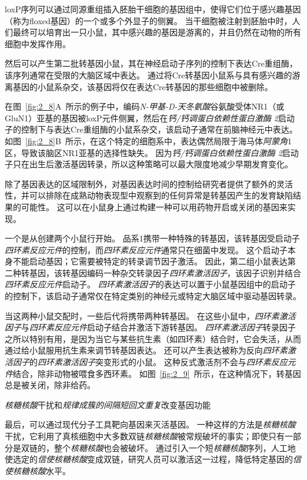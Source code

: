 \begin{proposition}[在实验动物中产生突变]
	\quad \quad loxP序列可以通过同源重组插入胚胎干细胞的基因组中，使得它们位于感兴趣基因（称为floxed基因）的一个或多个外显子的侧翼。
	当干细胞被注射到胚胎中时，人们最终可以培育出一只小鼠，其中感兴趣的基因是游离的，并且仍然在动物的所有细胞中发挥作用。
	
	\quad \quad 然后可以产生第二批转基因小鼠，其在神经启动子序列的控制下表达Cre重组酶，该序列通常在受限的大脑区域中表达。
	通过将Cre转基因小鼠系与具有感兴趣的游离基因的小鼠系杂交，该基因将仅在表达Cre转基因的那些细胞中被删除。
	
	\quad \quad 在图~\ref{fig:2_8}A~所示的例子中，编码\textit{N-甲基-D-天冬氨酸}谷氨酸受体NR1（或GluN1）亚基的基因被loxP元件侧翼，然后在\textit{钙/钙调蛋白依赖性蛋白激酶 2}启动子的控制下与表达Cre重组酶的小鼠系杂交，该启动子通常在前脑神经元中表达。
	如图~\ref{fig:2_8}B~所示，在这个特定的细胞系中，表达偶然局限于海马体\textit{阿蒙角}1区，导致该脑区NR1亚基的选择性缺失。
	因为\textit{钙/钙调蛋白依赖性蛋白激酶 2}启动子只在出生后激活基因转录，所以这种策略可以最大限度地减少早期发育变化。
	
	\quad \quad 除了基因表达的区域限制外，对基因表达时间的控制给研究者提供了额外的灵活性，并可以排除在成熟动物表现型中观察到的任何异常是转基因产生的发育缺陷结果的可能性。
	这可以在小鼠身上通过构建一种可以用药物开启或关闭的基因来实现。
	
	\quad \quad 一个是从创建两个小鼠行开始。
	品系1携带一种特殊的转基因，该转基因受启动子\textit{四环素反应元件}的控制，而\textit{四环素反应元件}通常只在细菌中发现。
	这个启动子本身不能启动基因；它需要被特定的转录调节因子激活。
	因此，第二组小鼠表达第二种转基因，该转基因编码一种杂交转录因子\textit{四环素激活因子}，该因子识别并结合\textit{四环素反应元件}启动子。
	\textit{四环素激活因子}的表达可以置于小鼠基因组中的启动子的控制下，该启动子通常仅在特定类别的神经元或特定大脑区域中驱动基因转录。
	
	\quad \quad 当这两种小鼠交配时，一些后代将携带两种转基因。
	在这些小鼠中，\textit{四环素激活因子}与\textit{四环素反应元件}启动子结合并激活下游转基因。
	\textit{四环素激活因子}转录因子之所以特别有用，是因为当它与某些抗生素（如四环素）结合时，它会失活，从而通过给小鼠服用抗生素来调节转基因表达。
	还可以产生表达被称为反向\textit{四环素激活因子}的\textit{四环素激活因子}突变形式的小鼠。
	这种反式激活剂不会与\textit{四环素反应元件}结合，除非动物被喂食多西环素。
	如图~\ref{fig:2_9}~所示，在这种情况下，转基因总是被关闭，除非给药。
	
	\quad \quad \textit{核糖核酸}干扰和\textit{规律成簇的间隔短回文重复}改变基因功能
	
	\quad \quad 最后，可以通过现代分子工具靶向基因来灭活基因。
	一种这样的方法是\textit{核糖核酸}干扰，它利用了真核细胞中大多数双链\textit{核糖核酸}被常规破坏的事实；即使只有一部分是双链的，整个\textit{核糖核酸}也会被破坏。
	通过引入一个短\textit{核糖核酸}序列，人工地使选定的\textit{信使核糖核酸}变成双链，研究人员可以激活这一过程，降低特定基因的\textit{信使核糖核酸}水平。
	
\end{proposition}


